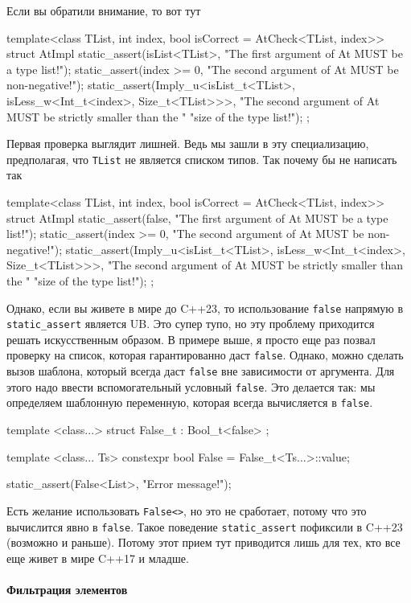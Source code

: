 Если вы обратили внимание, то вот тут
\begin{cppcode}
template<class TList, int index, bool isCorrect = AtCheck<TList, index>>
struct AtImpl {
  static_assert(isList<TList>, "The first argument of At MUST be a type list!");
  static_assert(index >= 0, "The second argument of At MUST be non-negative!");
  static_assert(Imply_u<isList_t<TList>, isLess_w<Int_t<index>, Size_t<TList>>>,
                "The second argument of At MUST be strictly smaller than the "
                "size of the type list!");
};
\end{cppcode}
Первая проверка выглядит лишней.
Ведь мы зашли в эту специализацию, предполагая, что \verb"TList" не является списком типов.
Так почему бы не написать так
\begin{cppcode}
template<class TList, int index, bool isCorrect = AtCheck<TList, index>>
struct AtImpl {
  static_assert(false, "The first argument of At MUST be a type list!");
  static_assert(index >= 0, "The second argument of At MUST be non-negative!");
  static_assert(Imply_u<isList_t<TList>, isLess_w<Int_t<index>, Size_t<TList>>>,
                "The second argument of At MUST be strictly smaller than the "
                "size of the type list!");
};
\end{cppcode}
Однако, если вы живете в мире до C++23, то  использование \verb"false" напрямую в \verb"static_assert" является UB.
Это супер тупо, но эту проблему приходится решать искусственным образом.
В примере выше, я просто еще раз позвал проверку на список, которая гарантированно даст \verb"false".
Однако, можно сделать вызов шаблона, который всегда даст \verb"false" вне зависимости от аргумента.
Для этого надо ввести вспомогательный условный \verb"false".
Это делается так: мы определяем шаблонную переменную, которая всегда вычисляется в \verb"false".
\begin{cppcode}
template <class...>
struct False_t : Bool_t<false> { };

template <class... Ts>
constexpr bool False = False_t<Ts...>::value;

static_assert(False<List>, "Error message!");
\end{cppcode}
Есть желание использовать \verb"False<>", но это не сработает, потому что это вычислится явно в \verb"false". 
Такое поведение \verb"static_assert" пофиксили в C++23 (возможно и раньше).
Потому этот прием тут приводится лишь для тех, кто все еще живет в мире C++17 и младше.

\paragraph{Фильтрация элементов}

